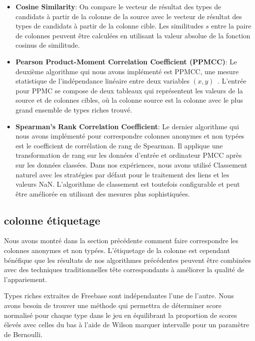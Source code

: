 \documentclass[a4paper,11pt,twoside]{ThesisStyle}
\begin{document}
\begin{itemize}
	\item \textbf{Cosine Similarity}: On compare le vecteur de résultat des types de candidats à partir de la colonne de la source avec le vecteur de résultat des types de candidats à partir de la colonne cible. Les similitudes $s$ entre la paire de colonnes peuvent être calculées en utilisant la valeur absolue de la fonction cosinus de similitude.
	\item \textbf{Pearson Product-Moment Correlation Coefficient (PPMCC)}: Le deuxième algorithme qui nous avons implémenté est PPMCC, une mesure statistique de l'indépendance linéaire entre deux variables $\left(x,y\right)$~\cite{Kowalski:RoyalStat:72}. L'entrée pour PPMC se compose de deux tableaux qui représentent les valeurs de la source et de colonnes cibles, où la colonne source est la colonne avec le plus grand ensemble de types riches trouvé.
	\item \textbf{Spearman's Rank Correlation Coefficient}: Le dernier algorithme qui nous avons implémenté pour correspondre colonnes anonymes et non typées est le coefficient de corrélation de rang de Spearman. Il applique une transformation de rang sur les données d'entrée et ordinateur PMCC après sur les données classées. Dans nos expériences, nous avons utilisé Classement naturel avec les stratégies par défaut pour le traitement des liens et les valeurs NaN. L'algorithme de classement est toutefois configurable et peut être améliorée en utilisant des mesures plus sophistiquées.
\end{itemize}

\subsection{colonne étiquetage}

Nous avons montré dans la section précédente comment faire correspondre les colonnes anonymes et non typées. L'étiquetage de la colonne est cependant bénéfique que les résultats de nos algorithmes précédentes peuvent être combinées avec des techniques traditionnelles tête correspondants à améliorer la qualité de l'appariement.

Types riches extraites de Freebase sont indépendantes l'une de l'autre. Nous avons besoin de trouver une méthode qui permettra de déterminer score normalisé pour chaque type dans le jeu en équilibrant la proportion de scores élevés avec celles du bas à l'aide de Wilson marquer intervalle pour un paramètre de Bernoulli.
\end{document}
